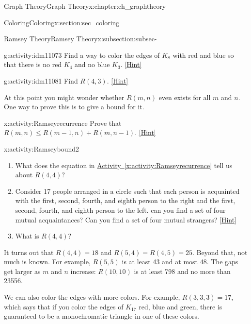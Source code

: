 \documentclass[oneside,10pt,]{book}
\numberwithin{equation}{chapter}
\begin{document}
\begin{chapterptx}{Graph Theory}{}{Graph Theory}{}{}{x:chapter:ch_graphtheory}
\begin{sectionptx}{Coloring}{}{Coloring}{}{}{x:section:sec_coloring}
\begin{subsectionptx}{Ramsey Theory}{}{Ramsey Theory}{}{}{x:subsection:subsec-}
\begin{activity}{}{g:activity:idm11073}
Find a way to color the edges of \(K_8\) with red and blue so that there is no red \(K_4\) and no blue \(K_3\).%
\space\hspace*{0pt}\hfill{\tiny\hyperlink{g:hint:idm11079-back}{[Hint]}}\end{activity}
\begin{activity}{}{g:activity:idm11081}%
Find \(R(4,3)\).%
\space\hspace*{0pt}\hfill{\tiny\hyperlink{g:hint:idm11085-back}{[Hint]}}\end{activity}
At this point you might wonder whether \(R(m,n)\) even exists for all \(m\) and \(n\).  One way to prove this is to give a bound for it.%
\begin{activity}{}{x:activity:Ramseyrecurrence}%
Prove that \(R(m,n)\le R(m-1,n) + R(m,n-1)\).%
\space\hspace*{0pt}\hfill{\tiny\hyperlink{g:hint:idm11100-back}{[Hint]}}\end{activity}
\begin{activity}{}{x:activity:Ramseybound2}%
\begin{enumerate}[font=\bfseries,label=(\alph*),ref=\alph*]
\item{}What does the equation in \hyperref[x:activity:Ramseyrecurrence]{Activity~\ref{x:activity:Ramseyrecurrence}} tell us about \(R(4,4)\)?%
\item{}Consider 17 people arranged in a circle such that each person is acquainted with the first, second, fourth, and eighth person to the right and the first, second, fourth, and eighth person to the left.  can you find a set of four mutual acquaintances?  Can you find a set of four mutual strangers?%
\space\hspace*{0pt}\hfill{\tiny\hyperlink{g:hint:idm11144-back}{[Hint]}}\item{}What is \(R(4,4)\)?%
\end{enumerate}
\end{activity}
It turns out that \(R(4,4) = 18\) and \(R(5, 4) = R(4,5) = 25\).  Beyond that, not much is known.  For example, \(R(5,5)\) is at least 43 and at most 48.  The gaps get larger as \(m\) and \(n\) increase: \(R(10,10)\) is at least 798 and no more than 23556.%
\par
We can also color the edges with more colors.  For example, \(R(3,3,3) = 17\), which says that if you color the edges of \(K_{17}\) red, blue and green, there is guaranteed to be a monochromatic triangle in one of these colors.%
\end{subsectionptx}
\end{sectionptx}

\end{chapterptx}
\end{document}
